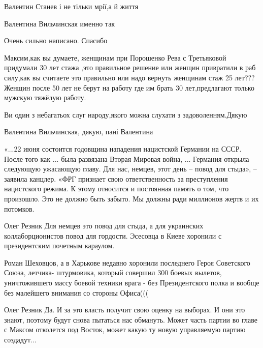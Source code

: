 \begin{itemize}
\begin{itemize}
Валентин Станев і не тільки мрії,а й життя

Валентина Вильчинская именно так
\end{itemize}

Очень сильно написано. Спасибо


Максим,как вы думаете, женщинам при Порошенко Рева с Третьяковой придумали 30
лет стажа ,это правильное решение или женщин привратили в раб силу,как вы
считаете это правильно или надо вернуть женщинам стаж 25 лет??? Женщин после 50
лет не берут на работу где им брать 30 лет,предлагают только мужскую тяжёлую
работу.

Ви один з небагатьох слуг народу,якого можна слухати з задоволенням.Дякую

Валентина Вильчинская, дякую, пані Валентина


«...22 июня состоится годовщина нападения нацистской Германии на СССР. После того
как ... была развязана Вторая Мировая война, ... Германия открыла следующую
ужасающую главу. Для нас, немцев, этот день – повод для стыда», – заявила
канцлер.  «ФРГ признает свою ответственность за преступления нацистского
режима. К этому относится и постоянная память о том, что произошло. Это не
должно быть забыто. Мы должны ради миллионов жертв и их потомков.

\begin{itemize}

Олег Резник Для немцев это повод для стыда, а для украинских коллаборционистов
повод для гордости. Эсесовца в Киеве хоронили с президентским почетным
караулом.


Роман Шеховцов, а в Харькове недавно хоронили последнего Героя Советского
Союза, летчика- штурмовика, который совершил 300 боевых вылетов, уничтожившего
массу боевой техники врага - без Президентского полка и вообще без малейшего
внимания со стороны Офиса(((


Олег Резник Да. И за это власть получит свою оценку на выборах. И они это
знают, поэтому будут снова пытаться нас обмануть. Может часть партии во главе с
Максом отколется под Восток, может какую ту новую управляемую партию
создадут...


\end{itemize}
\end{itemize}
